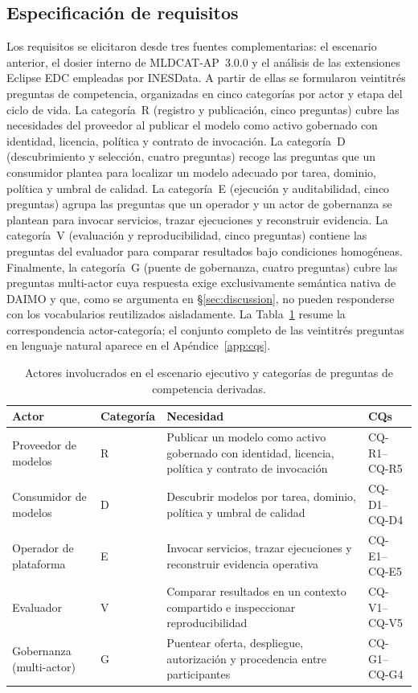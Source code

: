\documentclass[Afour,sagev,times]{sagej}
\newcommand{\cq}[1]{\textsf{#1}}
\begin{document}
\subsection{Especificación de requisitos}\label{sec:method-req}

Los requisitos se elicitaron desde tres fuentes complementarias: el escenario anterior, el dosier interno de MLDCAT-AP~3.0.0 y el análisis de las extensiones Eclipse EDC empleadas por INESData. A partir de ellas se formularon veintitrés preguntas de competencia, organizadas en cinco categorías por actor y etapa del ciclo de vida. La categoría~R (registro y publicación, cinco preguntas) cubre las necesidades del proveedor al publicar el modelo como activo gobernado con identidad, licencia, política y contrato de invocación. La categoría~D (descubrimiento y selección, cuatro preguntas) recoge las preguntas que un consumidor plantea para localizar un modelo adecuado por tarea, dominio, política y umbral de calidad. La categoría~E (ejecución y auditabilidad, cinco preguntas) agrupa las preguntas que un operador y un actor de gobernanza se plantean para invocar servicios, trazar ejecuciones y reconstruir evidencia. La categoría~V (evaluación y reproducibilidad, cinco preguntas) contiene las preguntas del evaluador para comparar resultados bajo condiciones homogéneas. Finalmente, la categoría~G (puente de gobernanza, cuatro preguntas) cubre las preguntas multi-actor cuya respuesta exige exclusivamente semántica nativa de DAIMO y que, como se argumenta en §\ref{sec:discussion}, no pueden responderse con los vocabularios reutilizados aisladamente. La Tabla~\ref{tab:actors} resume la correspondencia actor-categoría; el conjunto completo de las veintitrés preguntas en lenguaje natural aparece en el Apéndice~\ref{app:cqs}.

\begin{table}[t]
\small\sf\centering
\caption{Actores involucrados en el escenario ejecutivo y categorías de preguntas de competencia derivadas.\label{tab:actors}}
\begin{tabular}{@{}p{3.5cm}p{2cm}p{7cm}p{2.5cm}@{}}
\toprule
\textbf{Actor} & \textbf{Categoría} & \textbf{Necesidad} & \textbf{CQs} \\
\midrule
Proveedor de modelos & R & Publicar un modelo como activo gobernado con identidad, licencia, política y contrato de invocación & \cq{CQ-R1}--\cq{CQ-R5} \\
Consumidor de modelos & D & Descubrir modelos por tarea, dominio, política y umbral de calidad & \cq{CQ-D1}--\cq{CQ-D4} \\
Operador de plataforma & E & Invocar servicios, trazar ejecuciones y reconstruir evidencia operativa & \cq{CQ-E1}--\cq{CQ-E5} \\
Evaluador & V & Comparar resultados en un contexto compartido e inspeccionar reproducibilidad & \cq{CQ-V1}--\cq{CQ-V5} \\
Gobernanza (multi-actor) & G & Puentear oferta, despliegue, autorización y procedencia entre participantes & \cq{CQ-G1}--\cq{CQ-G4} \\
\bottomrule
\end{tabular}
\end{table}
\end{document}

